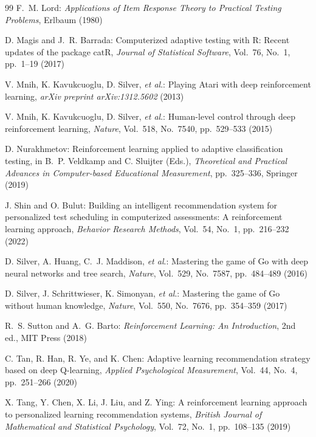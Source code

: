 \documentclass[dvipdfmx,a4j]{jarticle}
\begin{document}
\begin{thebibliography}{99}
F.~M. Lord:
\textit{Applications of Item Response Theory to Practical Testing Problems},
Erlbaum (1980)

D. Magis and J.~R. Barrada:
Computerized adaptive testing with R: Recent updates of the package catR,
\textit{Journal of Statistical Software}, Vol.~76, No.~1, pp.~1--19 (2017)

V. Mnih, K. Kavukcuoglu, D. Silver, \textit{et al}.:
Playing Atari with deep reinforcement learning,
\textit{arXiv preprint arXiv:1312.5602} (2013)

V. Mnih, K. Kavukcuoglu, D. Silver, \textit{et al}.:
Human-level control through deep reinforcement learning,
\textit{Nature}, Vol.~518, No.~7540, pp.~529--533 (2015)

D. Nurakhmetov:
Reinforcement learning applied to adaptive classification testing,
in B.~P. Veldkamp and C. Sluijter (Eds.),
\textit{Theoretical and Practical Advances in Computer-based Educational Measurement},
pp.~325--336, Springer (2019)

J. Shin and O. Bulut:
Building an intelligent recommendation system for personalized test scheduling in computerized assessments: A reinforcement learning approach,
\textit{Behavior Research Methods}, Vol.~54, No.~1, pp.~216--232 (2022)

D. Silver, A. Huang, C.~J. Maddison, \textit{et al}.:
Mastering the game of Go with deep neural networks and tree search,
\textit{Nature}, Vol.~529, No.~7587, pp.~484--489 (2016)

D. Silver, J. Schrittwieser, K. Simonyan, \textit{et al}.:
Mastering the game of Go without human knowledge,
\textit{Nature}, Vol.~550, No.~7676, pp.~354--359 (2017)

R.~S. Sutton and A.~G. Barto:
\textit{Reinforcement Learning: An Introduction},
2nd ed., MIT Press (2018)

C. Tan, R. Han, R. Ye, and K. Chen:
Adaptive learning recommendation strategy based on deep Q-learning,
\textit{Applied Psychological Measurement}, Vol.~44, No.~4, pp.~251--266 (2020)

X. Tang, Y. Chen, X. Li, J. Liu, and Z. Ying:
A reinforcement learning approach to personalized learning recommendation systems,
\textit{British Journal of Mathematical and Statistical Psychology},
Vol.~72, No.~1, pp.~108--135 (2019)


\end{thebibliography}
\end{document}
